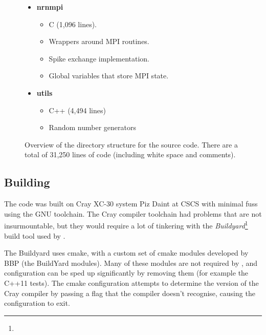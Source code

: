 \begin{figure}[tp!]
{{\begin{itemize}
    \item \textbf{nrnmpi}
    \begin{itemize}
        \item C (1,096 lines).
        \item Wrappers around MPI routines.
        \item Spike exchange implementation.
        \item Global variables that store MPI state.
    \end{itemize}

    \item \textbf{utils}
    \begin{itemize}
        \item C++ (4,494 lines)
        \item Random number generators
    \end{itemize}
\end{itemize}

}}

\caption{Overview of the directory structure for the source code. There are a total of 31,250 lines of code (including white space and comments).}
\label{fig:DirectoryStructure}

\end{figure}

\subsection{Building}
The code was built on Cray XC-30 system Piz Daint at CSCS with minimal fuss using the GNU toolchain.
The Cray compiler toolchain had problems that are not insurmountable, but they would require a lot of tinkering with the \emph{Buildyard}\footnote{} build tool used by \neuron.

The Buildyard uses cmake, with a custom set of cmake modules developed by BBP (the BuildYard modules). Many of these modules are not required by \neuron, and configuration can be sped up significantly by removing them (for example the C++11 tests). The cmake configuration attempts to determine the version of the Cray compiler by passing a flag that the compiler doesn't recognise, causing the configuration to exit.

